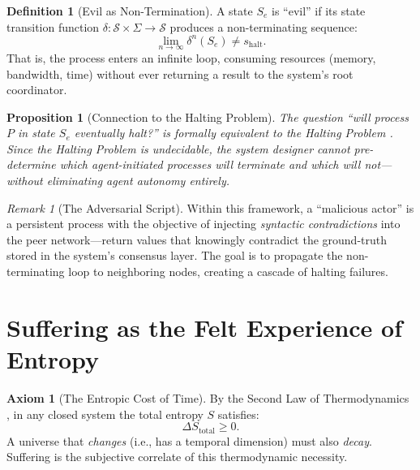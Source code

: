 \documentclass[12pt, a4paper]{article}
\theoremstyle{plain}
\newtheorem{proposition}[theorem]{Proposition}
\theoremstyle{definition}
\newtheorem{definition}[theorem]{Definition}
\newtheorem{axiom}[theorem]{Axiom}
\theoremstyle{remark}
\newtheorem{remark}[theorem]{Remark}
\newcommand{\calS}{\mathcal{S}}
\begin{document}
\begin{definition}[Evil as Non-Termination]\label{def:evil}
  A state $S_e$ is ``evil'' if its state transition function
  $\delta: \calS \times \Sigma \to \calS$ produces a non-terminating
  sequence:
  \begin{equation}\label{eq:evil}
    \lim_{n \to \infty} \delta^n(S_e) \neq s_{\text{halt}}.
  \end{equation}
  That is, the process enters an infinite loop, consuming resources
  (memory, bandwidth, time) without ever returning a result to the
  system's root coordinator.
\end{definition}

\begin{proposition}[Connection to the Halting Problem]\label{prop:halting}
  The question ``will process $P$ in state $S_e$ eventually halt?'' is
  formally equivalent to the Halting Problem \citep{Turing1936}. Since
  the Halting Problem is undecidable, the system designer \emph{cannot}
  pre-determine which agent-initiated processes will terminate and which
  will not---without eliminating agent autonomy entirely.
\end{proposition}

\begin{remark}[The Adversarial Script]
  Within this framework, a ``malicious actor'' is a persistent process
  with the objective of injecting \emph{syntactic contradictions} into
  the peer network---return values that knowingly contradict the
  ground-truth stored in the system's consensus layer. The goal is to
  propagate the non-terminating loop to neighboring nodes, creating a
  cascade of halting failures.
\end{remark}

\section{Suffering as the Felt Experience of Entropy}\label{sec:suffering}

\begin{axiom}[The Entropic Cost of Time]\label{ax:entropy}
  By the Second Law of Thermodynamics \citep{Clausius1865, Boltzmann1877},
  in any closed system the total entropy $S$ satisfies:
  \begin{equation}
    \Delta S_{\text{total}} \geq 0.
  \end{equation}
  A universe that \emph{changes} (i.e., has a temporal dimension) must
  also \emph{decay}. Suffering is the subjective correlate of this
  thermodynamic necessity.
\end{axiom}
\end{document}
